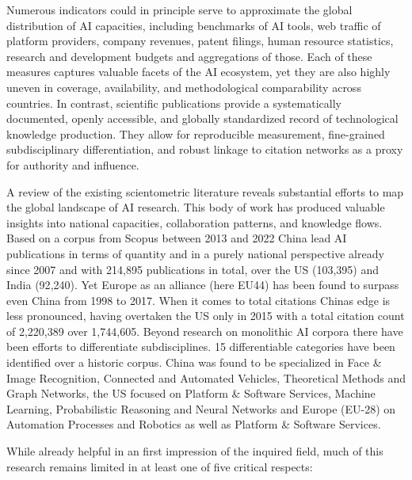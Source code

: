\documentclass{article}
\begin{document}
Numerous indicators could in principle serve to approximate the global distribution of AI capacities, including benchmarks of AI tools, web traffic of platform providers, company revenues, patent filings, human resource statistics, research and development budgets and aggregations of those. \cite{ozkaya2023analysis} Each of these measures captures valuable facets of the AI ecosystem, yet they are also highly uneven in coverage, availability, and methodological comparability across countries. In contrast, scientific publications provide a systematically documented, openly accessible, and globally standardized record of technological knowledge production. They allow for reproducible measurement, fine-grained subdisciplinary differentiation, and robust linkage to citation networks as a proxy for authority and influence.

A review of the existing scientometric literature reveals substantial efforts to map the global landscape of AI research. This body of work has produced valuable insights into national capacities, collaboration patterns, and knowledge flows. Based on a corpus from Scopus between 2013 and 2022 China lead AI publications in terms of quantity and in a purely national perspective already since 2007 and with 214{,}895 publications in total, over the US (103{,}395) and India (92{,}240). \cite{almarzouqi2024comparative} Yet Europe as an alliance (here EU44) has been found to surpass even China from 1998 to 2017. \cite{hellwig2019ai} When it comes to total citations Chinas edge is less pronounced, having overtaken the US only in 2015 with a total citation count of 2,220,389 over 1,744,605. \cite{almarzouqi2024comparative} Beyond research on monolithic AI corpora there have been efforts to differentiate subdisciplines. 15 differentiable categories have been identified over a historic corpus. \cite{gargiulo2022cartography}  China was found to be specialized in Face \& Image Recognition, Connected and Automated Vehicles, Theoretical Methods and Graph Networks, the US focused on Platform \& Software Services, Machine Learning, Probabilistic Reasoning and Neural Networks and Europe (EU-28) on Automation Processes and Robotics as well as Platform \& Software Services. \cite{righi2020ai, yu2023discovering}

While already helpful in an first impression of the inquired field, much of this research remains limited in at least one of five critical respects:
\end{document}
